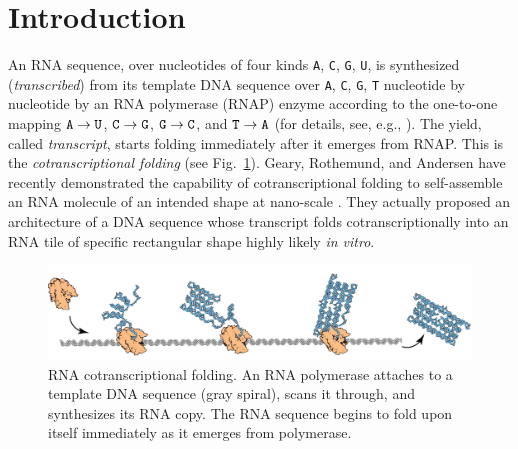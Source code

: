 	\section{Introduction}

An RNA sequence, over nucleotides of four kinds {\tt A}, {\tt C}, {\tt G}, {\tt U}, is synthesized (\textit{transcribed}) from its template DNA sequence over {\tt A}, {\tt C}, {\tt G}, {\tt T} nucleotide by nucleotide by an RNA polymerase (RNAP) enzyme according to the one-to-one mapping ${\tt A} \to {\tt U}$, ${\tt C} \to {\tt G}$, ${\tt G} \to {\tt C}$, and ${\tt T} \to {\tt A}$ (for details, see, e.g., \cite{AJLMRRW2014}). 
The yield, called \textit{transcript}, starts folding immediately after it emerges from RNAP. 
This is the \textit{cotranscriptional folding} (see Fig.~\ref{fig:rna_origami}). 
Geary, Rothemund, and Andersen have recently demonstrated the capability of cotranscriptional folding to self-assemble an RNA molecule of an intended shape at nano-scale \cite{GearyRothemundAndersen2014}. 
They actually proposed an architecture of a DNA sequence whose transcript folds cotranscriptionally into an RNA tile of specific rectangular shape highly likely \textit{in vitro}. 

\begin{figure}[tb]
\centering
\includegraphics[width=\linewidth]{pic/rna_origami.pdf}
\caption{RNA cotranscriptional folding. 
An RNA polymerase attaches to a template DNA sequence (gray spiral), scans it through, and synthesizes its RNA copy. 
The RNA sequence begins to fold upon itself immediately as it emerges from polymerase. 
}
\label{fig:rna_origami}
\end{figure}

